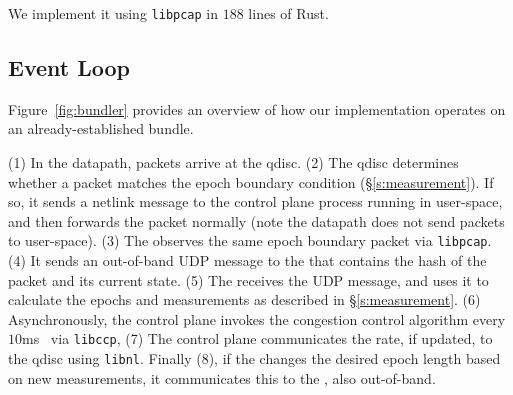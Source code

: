 \Para{\capoutbox} We implement it using \texttt{libpcap} in $188$ lines of Rust. 

\subsection{\name Event Loop}\label{s:impl:loop}
Figure~\ref{fig:bundler} provides an overview of how our \name implementation operates on an already-established bundle.

(1) In the datapath, packets arrive at the \inbox qdisc.
(2) The qdisc determines whether a packet matches the epoch boundary condition (\S\ref{s:measurement}). 
If so, it sends a netlink message to the control plane process running in user-space, and then forwards the packet normally (note the datapath does not send packets to user-space). 
(3) The \outbox observes the same epoch boundary packet via \texttt{libpcap}.
(4) It sends an out-of-band UDP message to the \inbox that contains the hash of the packet and its current state. 
(5) The \inbox receives the UDP message, and uses it to calculate the epochs and measurements as described 
in \S\ref{s:measurement}. 
(6) Asynchronously, the \inbox control plane invokes the congestion control algorithm every $10$ms~\cite{ccp}
via \texttt{libccp},
(7) The \inbox control plane communicates the rate, if updated, to the qdisc
using \texttt{libnl}. 
Finally (8), if the \inbox changes the desired epoch length based on new measurements, it communicates this to the \outbox, also out-of-band.
